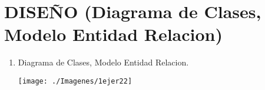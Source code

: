 \section{ DISEÑO (Diagrama de Clases, Modelo Entidad Relacion)} 

\begin{enumerate}[1.]
	\item Diagrama de Clases, Modelo Entidad Relacion.
    


	\begin{center}
	\texttt{[image: ./Imagenes/1ejer22]} 
	\end{center}

\end{enumerate} 
